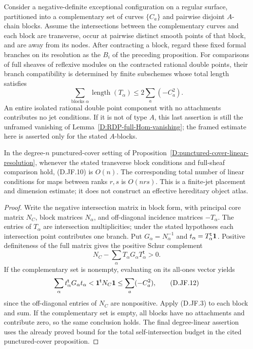 \begin{corollary}
\label{D:A-block-total-jet-budget}
Consider a negative-definite exceptional configuration on a
regular surface, partitioned into a complementary set of
curves $\{C_a\}$ and pairwise disjoint $A$-chain blocks.
Assume the intersections between the complementary curves
and each block are transverse, occur at pairwise distinct
smooth points of that block, and are away from its nodes.
After contracting a block, regard these fixed formal branches
on its resolution as the $B_i$ of the preceding proposition.
For comparisons of full sheaves of reflexive modules on the
contracted rational double points, their branch compatibility
is determined by finite subschemes whose total length satisfies
\[
          \sum_{\text{blocks }\alpha}\operatorname{length}(T_\alpha)
                        \le 2\sum_a(-C_a^2).            \tag{D.JF.10}
\]
An entire isolated rational double point component with no
attachments contributes no jet conditions.  If it is not of
type $A$, this last assertion is still the unframed vanishing
of Lemma~\ref{D:RDP-full-Hom-vanishing}; the framed estimate
here is asserted only for the stated $A$-blocks.

In the degree-$n$ punctured-cover setting of
Proposition~\ref{D:punctured-cover-linear-resolution}, whenever
the stated transverse block conditions and full-sheaf comparison
hold, (D.JF.10) is $O(n)$.  The corresponding total number of
linear conditions for maps between ranks $r,s$ is $O(nrs)$.
This is a finite-jet placement and dimension estimate; it
does not construct an effective hereditary object atlas.
\end{corollary}
\begin{proof}
Write the negative intersection matrix in block form, with
principal core matrix $N_C$, block matrices $N_\alpha$, and
off-diagonal incidence matrices $-T_\alpha$.
The entries of $T_\alpha$ are intersection multiplicities;
under the stated hypotheses each intersection point contributes
one branch.  Put
$G_\alpha=N_\alpha^{-1}$ and
$t_\alpha=T_\alpha^{\mathsf t}{\bf1}$.
Positive definiteness of the full matrix gives the positive
Schur complement
\[
        N_C-\sum_\alpha T_\alpha G_\alpha T_\alpha^{\mathsf t}>0.
                                                        \tag{D.JF.11}
\]
If the complementary set is nonempty, evaluating on its
all-ones vector yields
\[
 \sum_\alpha t_\alpha^{\mathsf t}G_\alpha t_\alpha
       <{\bf1}^{\mathsf t}N_C{\bf1}
       \le\sum_a(-C_a^2),                               \tag{D.JF.12}
\]
since the off-diagonal entries of $N_C$ are nonpositive.
Apply (D.JF.3) to each block and sum.
If the complementary set is empty, all blocks have no
attachments and contribute zero, so the same conclusion holds.
The final degree-linear assertion uses the already proved
bound for the total self-intersection budget in the cited
punctured-cover proposition.
\end{proof}

